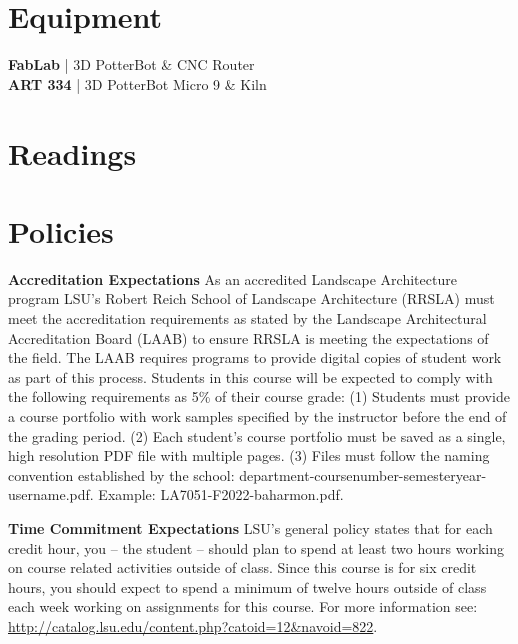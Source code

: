 \documentclass[11pt,article,oneside]{memoir}
\begin{document}
\section{Equipment}
\textbf{FabLab} | 3D PotterBot \& CNC Router\\
\textbf{ART 334} | 3D PotterBot Micro 9 \& Kiln

\section{Readings}
\vspace*{0.5cm}
\nocite{*}
\setlength{}
\printbibliography[heading=none]


\section{Policies}

\noindent \textbf{Accreditation Expectations}
As an accredited Landscape Architecture program
LSU's Robert Reich School of Landscape Architecture (RRSLA) 
must meet the accreditation requirements 
as stated by the Landscape Architectural Accreditation
Board (LAAB) to ensure RRSLA is meeting the expectations of the field. 
The LAAB requires programs to provide digital copies 
of student work as part of this process.
Students in this course will be expected 
to comply with the following requirements
as 5\% of their course grade: 
(1) Students must provide a course portfolio
with work samples specified by the instructor 
before the end of the grading period. 
(2) Each student's course portfolio must be saved as 
a single, high resolution PDF file with multiple pages. 
(3) Files must follow the naming convention
established by the school: department-coursenumber-semesteryear-username.pdf.
Example: LA7051-F2022-baharmon.pdf.
\\

\clearpage

\noindent \textbf{Time Commitment Expectations}
LSU's general policy states that for each credit hour, you -- the student -- should plan to
spend at least two hours working on course related activities outside of class. Since this course is for six credit hours, you should expect to spend a minimum of twelve hours outside of class each week working on assignments for this course. For more information see: 
\url{http://catalog.lsu.edu/content.php?catoid=12&navoid=822}.
\\
\end{document}
